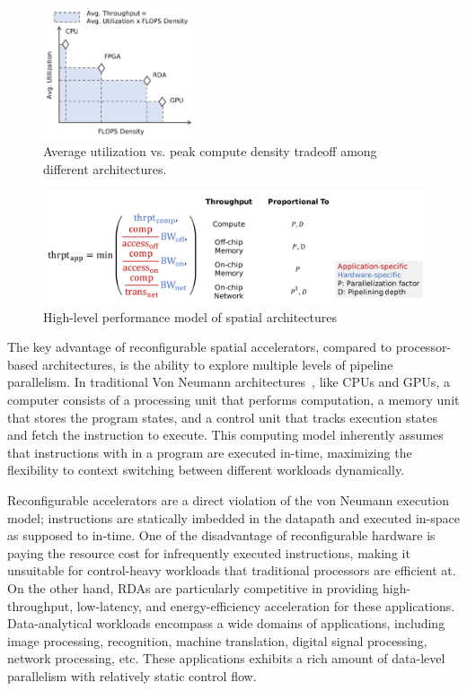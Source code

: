 \begin{figure}
\centering
\includegraphics[width=0.4\textwidth]{figs/peakutil.pdf}
\caption[Average utilization vs. peak compute density tradeoff]{
 Average utilization vs. peak compute density tradeoff among different architectures.
}
\label{fig:peakutil}
\end{figure}

\begin{figure}
\centering
\includegraphics[width=1\textwidth]{figs/perfmodel.pdf}
\caption[High-level performance model of spatial architectures]{
High-level performance model of spatial architectures
}
\label{fig:perfmodel}
\end{figure}

The key advantage of reconfigurable spatial accelerators, compared to processor-based architectures, 
is the ability to explore multiple levels of pipeline parallelism. 
In traditional Von Neumann architectures~\cite{vonneumann}, like CPUs and GPUs,
a computer consists of a processing unit that performs
computation, a memory unit that stores the program states, and a control unit that tracks execution
states and fetch the instruction to execute. This computing model inherently assumes that
instructions with in a program are executed in-time, maximizing the flexibility to 
context switching between different workloads dynamically.

Reconfigurable accelerators are a direct violation of the von Neumann execution model; 
instructions are statically imbedded in the datapath and executed in-space as supposed to in-time.
One of the disadvantage of reconfigurable hardware is paying the resource cost for infrequently
executed instructions, making it unsuitable for control-heavy workloads that traditional
processors are efficient at.
On the other hand, RDAs are particularly competitive in providing high-throughput, 
low-latency, and energy-efficiency acceleration for these applications.
Data-analytical workloads encompass a wide domains of applications, including image processing,
recognition, machine translation, digital signal processing, network processing, etc.
These applications exhibits a rich amount of data-level parallelism with relatively static control
flow.

